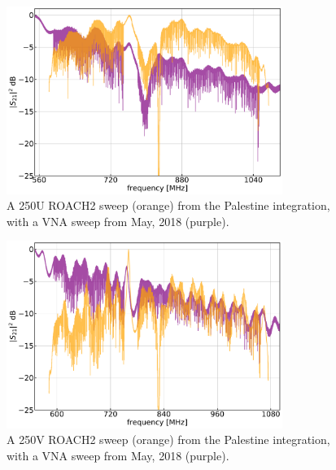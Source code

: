 \begin{figure}[!htbp]
\centering
\includegraphics[width=0.8\textwidth]{figures/blast_data/sweeps/250U_VNA_overplot}
\caption[~A 250U ROACH2 sweep from the Palestine integration, with a VNA sweep from May, 2018.]{A 250U ROACH2 sweep (orange) from the Palestine integration, with a VNA sweep from May, 2018 (purple).}
\label{fig:VNA comp 250U}
\end{figure}

\begin{figure}[!htbp]
\centering
\includegraphics[width=0.8\textwidth]{figures/blast_data/sweeps/250V_VNA_overplot}
\caption[~A 250V ROACH2 sweep from the Palestine integration, with a VNA sweep from May, 2018.]{A 250V ROACH2 sweep (orange) from the Palestine integration, with a VNA sweep from May, 2018 (purple).}
\label{fig:VNA comp 250V}
\end{figure}

